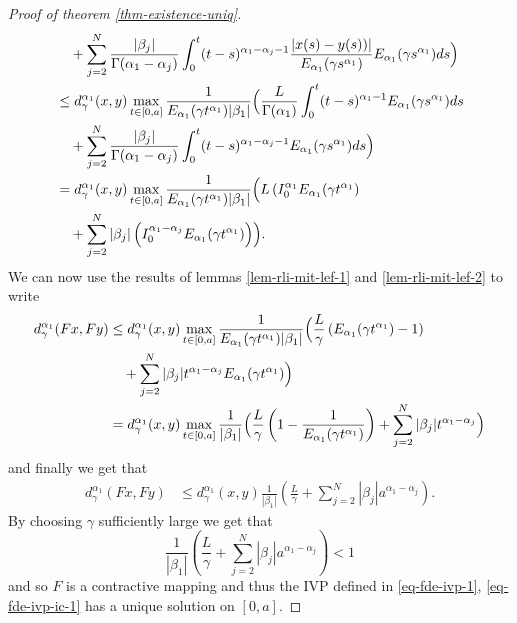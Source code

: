 \documentclass{unswmaths}
\begin{document}
\begin{proof}[Proof of theorem \ref{thm-existence-uniq}]
\begin{align*}
			& \ \ \ + \sum_{j=2}^N \frac{|\beta_j|}{\Gamma(\alpha_1 - \alpha_j)} \int_0^t (t-s)^{\alpha_1 - \alpha_j - 1}\frac{|x(s) - y(s))|}{E_{\alpha_1}(\gamma s^{\alpha_1})}E_{\alpha_1}(\gamma s^{\alpha_1}) ds \Bigr) \\
			&\leq d_\gamma^{\alpha_1}(x,y) \max_{t \in [0, a]} \frac{1}{E_{\alpha_1}(\gamma t^{\alpha_1})|\beta_1|} \Bigl(
			\frac{L}{\Gamma(\alpha_1)}\int_0^t (t-s)^{\alpha_1 - 1} E_{\alpha_1}(\gamma s^{\alpha_1}) ds \\
			& \ \ \ + \sum_{j=2}^N \frac{|\beta_j|}{\Gamma(\alpha_1 - \alpha_j)} \int_0^t (t-s)^{\alpha_1 - \alpha_j - 1}E_{\alpha_1}(\gamma s^{\alpha_1}) ds \Bigr) \\
			&= d_\gamma^{\alpha_1}(x,y) \max_{t \in [0, a]} \frac{1}{E_{\alpha_1}(\gamma t^{\alpha_1})|\beta_1|} \Bigl(
			L \left( I_{0}^{\alpha_1} E_{\alpha_1}(\gamma t^{\alpha_1} \right) \\
			& \ \ \ + \sum_{j=2}^N |\beta_j| \left( I_{0}^{\alpha_1 - \alpha_j} E_{\alpha_1}(\gamma t^{\alpha_1}) \right) \Bigr). \\
	\end{align*}
	We can now use the results of lemmas \ref{lem-rli-mit-lef-1} and \ref{lem-rli-mit-lef-2} to write
	\begin{align*}
		d_\gamma^{\alpha_1}(Fx,Fy) &\leq d_\gamma^{\alpha_1}(x,y) \max_{t \in [0, a]} \frac{1}{E_{\alpha_1}(\gamma t^{\alpha_1})|\beta_1|} \Bigl(
			\frac{L}{\gamma}\left( E_{\alpha_1}(\gamma t^{\alpha_1}) - 1 \right) \\
			& \ \ \ + \sum_{j=2}^N |\beta_j| t^{\alpha_1 - \alpha_j} E_{\alpha_1}(\gamma t^{\alpha_1}) \Bigr) \\
			&= d_\gamma^{\alpha_1}(x,y) \max_{t \in [0, a]} \frac{1}{|\beta_1|} \Bigl(
			\frac{L}{\gamma}\left( 1- \frac{1}{E_{\alpha_1}(\gamma t^{\alpha_1})} \right) + \sum_{j=2}^N |\beta_j| t^{\alpha_1 - \alpha_j}\Bigr) \\
	\end{align*}
	and finally we get that 
	\begin{align*}
		d_\gamma^{\alpha_1}(Fx,Fy) &\leq d_\gamma^{\alpha_1}(x,y) \frac{1}{|\beta_1|}\left( \frac{L}{\gamma} + \sum_{j=2}^N |\beta_j| a^{\alpha_1 - \alpha_j} \right).
	\end{align*}
	By choosing $ \gamma $ sufficiently large we get that 
	$$
		\frac{1}{|\beta_1|}\left( \frac{L}{\gamma} + \sum_{j=2}^N |\beta_j| a^{\alpha_1 - \alpha_j} \right) < 1
	$$
	and so $ F $ is a contractive mapping and thus the IVP defined in \eqref{eq-fde-ivp-1}, \eqref{eq-fde-ivp-ic-1} has a unique solution on $ [0, a] $.
\end{proof}
\end{document}
